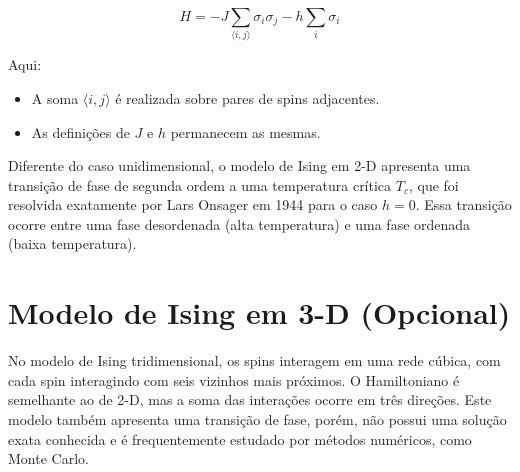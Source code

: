 \documentclass{article}
\begin{document}
\begin{equation}
H = -J \sum_{\langle i,j \rangle} \sigma_i \sigma_j - h \sum_{i} \sigma_i
\end{equation}

Aqui:
\begin{itemize}
    \item A soma $\langle i,j \rangle$ é realizada sobre pares de spins adjacentes.
    \item As definições de $J$ e $h$ permanecem as mesmas.
\end{itemize}

Diferente do caso unidimensional, o modelo de Ising em 2-D apresenta uma transição de fase de segunda ordem a uma temperatura crítica $T_c$, que foi resolvida exatamente por Lars Onsager em 1944 para o caso $h = 0$. Essa transição ocorre entre uma fase desordenada (alta temperatura) e uma fase ordenada (baixa temperatura).

\section{Modelo de Ising em 3-D (Opcional)}

No modelo de Ising tridimensional, os spins interagem em uma rede cúbica, com cada spin interagindo com seis vizinhos mais próximos. O Hamiltoniano é semelhante ao de 2-D, mas a soma das interações ocorre em três direções. Este modelo também apresenta uma transição de fase, porém, não possui uma solução exata conhecida e é frequentemente estudado por métodos numéricos, como Monte Carlo.
\end{document}
